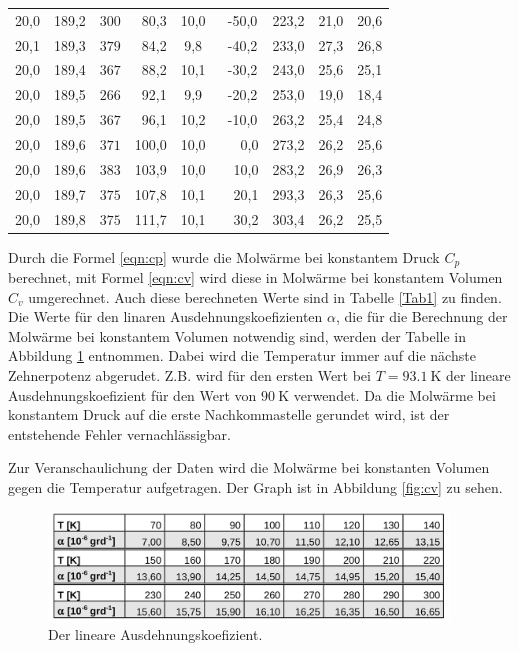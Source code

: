 \begin{table}
\begin{tabular}{S[table-format=2.1] S S S[table-format=2.1] S S S S S}
          {20,0 } & {189,2}  & {$300$} & {~80,3} & 10,0 & {~-50,0} & 223,2 & {21,0} & {20,6} \\
          {20,1 } & {189,3}  & {$379$} & {~84,2} &  9,8 & {~-40,2} & 233,0 & {27,3} & {26,8} \\
          {20,0 } & {189,4}  & {$367$} & {~88,2} & 10,1 & {~-30,2} & 243,0 & {25,6} & {25,1} \\
          {20,0 } & {189,5}  & {$266$} & {~92,1} &  9,9 & {~-20,2} & 253,0 & {19,0} & {18,4} \\
          {20,0 } & {189,5}  & {$367$} & {~96,1} & 10,2 & {~-10,0} & 263,2 & {25,4} & {24,8} \\
          {20,0 } & {189,6}  & {$371$} & {100,0} & 10,0 & {~~~0,0} & 273,2 & {26,2} & {25,6} \\
          {20,0 } & {189,6}  & {$383$} & {103,9} & 10,0 & {~~10,0} & 283,2 & {26,9} & {26,3} \\
          {20,0 } & {189,7}  & {$375$} & {107,8} & 10,1 & {~~20,1} & 293,3 & {26,3} & {25,6} \\
          {20,0 } & {189,8}  & {$375$} & {111,7} & 10,1 & {~~30,2} & 303,4 & {26,2} & {25,5} \\
      \bottomrule
    \end{tabular}
\end{table}
\FloatBarrier

Durch die Formel \ref{eqn:cp} wurde die Molwärme bei konstantem Druck $C_{\si{p}}$ berechnet, mit Formel 
\ref{eqn:cv} wird diese in Molwärme bei konstantem Volumen $C_{\si{v}}$ umgerechnet. Auch diese berechneten 
Werte sind in Tabelle \ref{Tab1} zu finden. Die Werte für den 
linaren Ausdehnungskoefizienten $\alpha$, die für die Berechnung der Molwärme bei konstantem Volumen notwendig 
sind, werden der Tabelle in Abbildung \ref{fig:a} entnommen. Dabei wird die 
Temperatur immer auf die nächste Zehnerpotenz abgerudet. Z.B. wird für den ersten Wert bei 
$T=\SI{93,1}{\kelvin}$ der lineare Ausdehnungskoefizient für den Wert von $\SI{90}{\kelvin}$ verwendet. 
Da die Molwärme bei konstantem Druck auf die erste Nachkommastelle gerundet wird, ist der entstehende 
Fehler vernachlässigbar.

Zur Veranschaulichung der Daten wird die Molwärme bei konstanten Volumen gegen die Temperatur aufgetragen. 
Der Graph ist in Abbildung \ref{fig:cv} zu sehen. 

\begin{figure}
  \centering
  \includegraphics[width=0.95\textwidth]{alpha.png}
  \caption{Der lineare Ausdehnungskoefizient.}
  \label{fig:a}
\end{figure}

